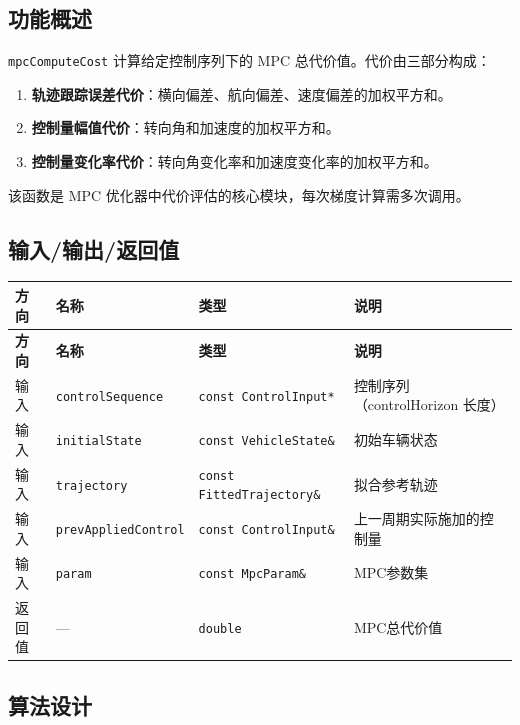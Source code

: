 \documentclass[a4paper,10pt]{article}
\begin{document}
\subsection{功能概述}

\texttt{mpcComputeCost} 计算给定控制序列下的 MPC 总代价值。代价由三部分构成：
\begin{enumerate}
  \item \textbf{轨迹跟踪误差代价}：横向偏差、航向偏差、速度偏差的加权平方和。
  \item \textbf{控制量幅值代价}：转向角和加速度的加权平方和。
  \item \textbf{控制量变化率代价}：转向角变化率和加速度变化率的加权平方和。
\end{enumerate}

该函数是 MPC 优化器中代价评估的核心模块，每次梯度计算需多次调用。

\subsection{输入/输出/返回值}

\renewcommand{\arraystretch}{1.3}
\begin{longtable}{|C{1.5cm}|L{3.5cm}|C{3cm}|L{7cm}|}
\hline
\textbf{方向} & \textbf{名称} & \textbf{类型} & \textbf{说明} \\
\hline
\endfirsthead
\hline
\textbf{方向} & \textbf{名称} & \textbf{类型} & \textbf{说明} \\
\hline
\endhead
输入 & \texttt{controlSequence} & \texttt{const ControlInput*} & 控制序列（controlHorizon 长度） \\
\hline
输入 & \texttt{initialState} & \texttt{const VehicleState\&} & 初始车辆状态 \\
\hline
输入 & \texttt{trajectory} & \texttt{const FittedTrajectory\&} & 拟合参考轨迹 \\
\hline
输入 & \texttt{prevAppliedControl} & \texttt{const ControlInput\&} & 上一周期实际施加的控制量 \\
\hline
输入 & \texttt{param} & \texttt{const MpcParam\&} & MPC参数集 \\
\hline
返回值 & --- & \texttt{double} & MPC总代价值 \\
\hline
\end{longtable}

\subsection{算法设计}
\end{document}

